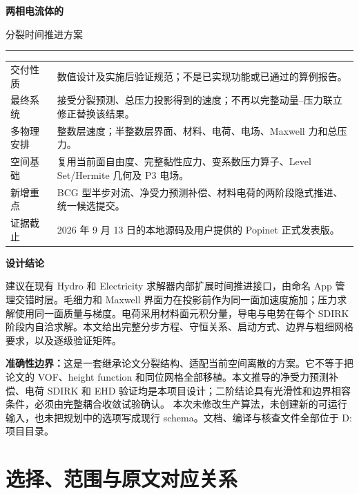 \documentclass[UTF8,a4paper,11pt,fontset=fandol]{ctexart}
\numberwithin{equation}{section}
\begin{document}
\begin{titlepage}
\vspace*{15mm}
{\Huge\bfseries\color{ink} 两相电流体的\par 分裂时间推进方案\par}
\vspace{8mm}{\LARGE 基于 Popinet（2009）时间交错与平衡力思想\par}
\vspace{5mm}{\Large QUANTUM 原生面速度、矩形四叉树与 RZ 适配\par}
\vspace{10mm}\noindent\rule{\textwidth}{.7pt}
\begin{tabularx}{\textwidth}{@{}lX@{}}
交付性质 & 数值设计及实施后验证规范；不是已实现功能或已通过的算例报告。\\
最终系统 & 接受分裂预测、总压力投影得到的速度；不再以完整动量--压力联立修正替换该结果。\\
多物理安排 & 整数层速度；半整数层界面、材料、电荷、电场、Maxwell 力和总压力。\\
空间基础 & 复用当前面自由度、完整黏性应力、变系数压力算子、Level Set/Hermite 几何及 P3 电场。\\
新增重点 & BCG 型半步对流、净受力预测补偿、材料电荷的两阶段隐式推进、统一候选提交。\\
证据截止 & 2026 年 9 月 13 日的本地源码及用户提供的 Popinet 正式发表版。\\
\end{tabularx}
\vspace{8mm}\noindent\textbf{设计结论}\par
建议在现有 Hydro 和 Electricity 求解器内部扩展时间推进接口，由命名 App 管理交错时层。毛细力和 Maxwell 界面力在投影前作为同一面加速度施加；压力求解使用同一面质量与梯度。电荷采用材料面元积分量，导电与电势在每个 SDIRK 阶段内自洽求解。本文给出完整分步方程、守恒关系、启动方式、边界与粗细网格要求，以及逐级验证矩阵。

\textbf{准确性边界：}这是一套继承论文分裂结构、适配当前空间离散的方案。它不等于把论文的 VOF、height function 和同位网格全部移植。本文推导的净受力预测补偿、电荷 SDIRK 和 EHD 验证均是本项目设计；二阶结论具有光滑性和边界相容条件，必须由完整耦合收敛试验确认。
\vfill\small 本次未修改生产算法，未创建新的可运行输入，也未把规划中的选项写成现行 schema。文档、编译与核查文件全部位于 D: 项目目录。
\end{titlepage}
\setcounter{tocdepth}{1}\tableofcontents
\clearpage
\section{选择、范围与原文对应关系}
\end{document}
